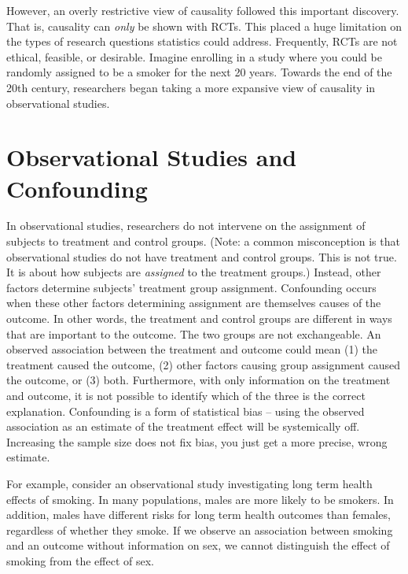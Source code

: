 \documentclass[
]{book}
\begin{document}
However, an overly restrictive view of causality followed this important discovery. That is, causality can \emph{only} be shown with RCTs. This placed a huge limitation on the types of research questions statistics could address. Frequently, RCTs are not ethical, feasible, or desirable. Imagine enrolling in a study where you could be randomly assigned to be a smoker for the next 20 years. Towards the end of the 20th century, researchers began taking a more expansive view of causality in observational studies.

\hypertarget{observational-studies-and-confounding}{%
\section{Observational Studies and Confounding}\label{observational-studies-and-confounding}}

In observational studies, researchers do not intervene on the assignment of subjects to treatment and control groups. (Note: a common misconception is that observational studies do not have treatment and control groups. This is not true. It is about how subjects are \emph{assigned} to the treatment groups.) Instead, other factors determine subjects' treatment group assignment. Confounding occurs when these other factors determining assignment are themselves causes of the outcome. In other words, the treatment and control groups are different in ways that are important to the outcome. The two groups are not exchangeable. An observed association between the treatment and outcome could mean (1) the treatment caused the outcome, (2) other factors causing group assignment caused the outcome, or (3) both. Furthermore, with only information on the treatment and outcome, it is not possible to identify which of the three is the correct explanation. Confounding is a form of statistical bias -- using the observed association as an estimate of the treatment effect will be systemically off. Increasing the sample size does not fix bias, you just get a more precise, wrong estimate.

For example, consider an observational study investigating long term health effects of smoking. In many populations, males are more likely to be smokers. In addition, males have different risks for long term health outcomes than females, regardless of whether they smoke. If we observe an association between smoking and an outcome without information on sex, we cannot distinguish the effect of smoking from the effect of sex.
\end{document}
